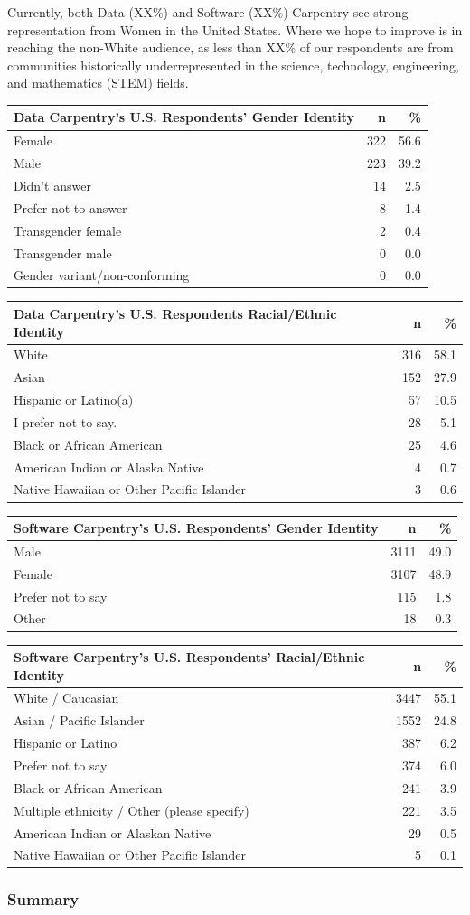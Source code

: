 \documentclass[]{article}
\begin{document}
Currently, both Data (XX\%) and Software (XX\%) Carpentry see strong
representation from Women in the United States. Where we hope to improve
is in reaching the non-White audience, as less than XX\% of our
respondents are from communities historically underrepresented in the
science, technology, engineering, and mathematics (STEM) fields.

\begin{longtable}[]{@{}lrr@{}}
\toprule
Data Carpentry's U.S. Respondents' Gender Identity & n &
\%\tabularnewline
\midrule
\endhead
Female & 322 & 56.6\tabularnewline
Male & 223 & 39.2\tabularnewline
Didn't answer & 14 & 2.5\tabularnewline
Prefer not to answer & 8 & 1.4\tabularnewline
Transgender female & 2 & 0.4\tabularnewline
Transgender male & 0 & 0.0\tabularnewline
Gender variant/non-conforming & 0 & 0.0\tabularnewline
\bottomrule
\end{longtable}

\begin{longtable}[]{@{}lrr@{}}
\toprule
Data Carpentry's U.S. Respondents Racial/Ethnic Identity & n &
\%\tabularnewline
\midrule
\endhead
White & 316 & 58.1\tabularnewline
Asian & 152 & 27.9\tabularnewline
Hispanic or Latino(a) & 57 & 10.5\tabularnewline
I prefer not to say. & 28 & 5.1\tabularnewline
Black or African American & 25 & 4.6\tabularnewline
American Indian or Alaska Native & 4 & 0.7\tabularnewline
Native Hawaiian or Other Pacific Islander & 3 & 0.6\tabularnewline
\bottomrule
\end{longtable}

\begin{longtable}[]{@{}lrr@{}}
\toprule
Software Carpentry's U.S. Respondents' Gender Identity & n &
\%\tabularnewline
\midrule
\endhead
Male & 3111 & 49.0\tabularnewline
Female & 3107 & 48.9\tabularnewline
Prefer not to say & 115 & 1.8\tabularnewline
Other & 18 & 0.3\tabularnewline
\bottomrule
\end{longtable}

\begin{longtable}[]{@{}lrr@{}}
\toprule
Software Carpentry's U.S. Respondents' Racial/Ethnic Identity & n &
\%\tabularnewline
\midrule
\endhead
White / Caucasian & 3447 & 55.1\tabularnewline
Asian / Pacific Islander & 1552 & 24.8\tabularnewline
Hispanic or Latino & 387 & 6.2\tabularnewline
Prefer not to say & 374 & 6.0\tabularnewline
Black or African American & 241 & 3.9\tabularnewline
Multiple ethnicity / Other (please specify) & 221 & 3.5\tabularnewline
American Indian or Alaskan Native & 29 & 0.5\tabularnewline
Native Hawaiian or Other Pacific Islander & 5 & 0.1\tabularnewline
\bottomrule
\end{longtable}

\subsubsection{Summary}\label{summary}
\end{document}

